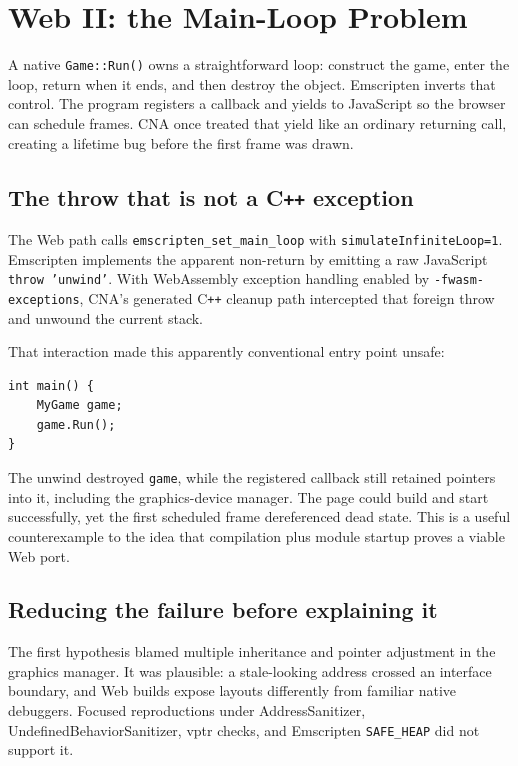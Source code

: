 \chapter{Web II: the Main-Loop Problem}
\label{ch:web-main-loop}

A native \texttt{Game::Run()} owns a straightforward loop: construct the game, enter the loop,
return when it ends, and then destroy the object.  Emscripten inverts that control.  The program
registers a callback and yields to JavaScript so the browser can schedule frames.  CNA once
treated that yield like an ordinary returning call, creating a lifetime bug before the first
frame was drawn.



\section{The throw that is not a C\texttt{++} exception}

The Web path calls \texttt{emscripten\_set\_main\_loop} with
\texttt{simulateInfiniteLoop=1}.  Emscripten implements the apparent non-return by emitting a
raw JavaScript \texttt{throw 'unwind'}.  With WebAssembly exception handling enabled by
\texttt{-fwasm-exceptions}, CNA's generated C\texttt{++} cleanup path intercepted that foreign
throw and unwound the current stack.

That interaction made this apparently conventional entry point unsafe:

\begin{verbatim}
int main() {
    MyGame game;
    game.Run();
}
\end{verbatim}

The unwind destroyed \texttt{game}, while the registered callback still retained pointers into
it, including the graphics-device manager.  The page could build and start successfully, yet
the first scheduled frame dereferenced dead state.  This is a useful counterexample to the
idea that compilation plus module startup proves a viable Web port.

\section{Reducing the failure before explaining it}

The first hypothesis blamed multiple inheritance and pointer adjustment in the graphics
manager.  It was plausible: a stale-looking address crossed an interface boundary, and Web
builds expose layouts differently from familiar native debuggers.  Focused reproductions under
AddressSanitizer, UndefinedBehaviorSanitizer, vptr checks, and Emscripten \texttt{SAFE\_HEAP}
did not support it.

